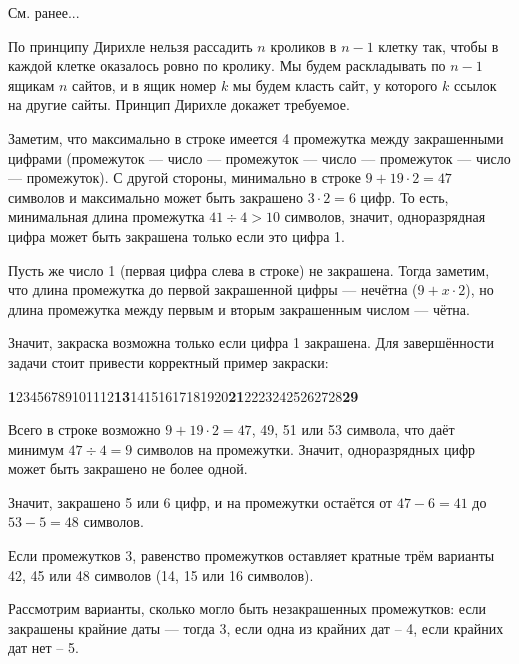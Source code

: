 
\begin{itemize}
\itA См. ранее...

\itB По принципу Дирихле нельзя рассадить $n$ кроликов в $n-1$ клетку так, 
чтобы в каждой клетке оказалось ровно по кролику.
Мы будем раскладывать по $n-1$ ящикам $n$ сайтов, и в ящик номер $k$ мы будем класть
сайт, у которого $k$ ссылок на другие сайты. Принцип Дирихле докажет требуемое.

\itC Заметим, что максимально в строке имеется 4 промежутка между закрашенными цифрами
(промежуток --- число --- промежуток --- число --- промежуток --- число --- промежуток).
С другой стороны, минимально в строке $9 + 19\cdot 2 = 47$ символов и максимально может 
быть закрашено $3 \cdot 2 = 6$ цифр.
То есть, минимальная длина промежутка $41 \div 4 > 10$ символов, значит, одноразрядная
цифра может быть закрашена только если это цифра 1.

Пусть же число 1 (первая цифра слева в строке) не закрашена. Тогда заметим, что длина
промежутка до первой закрашенной цифры --- нечётна ($9 + x \cdot 2$), но длина промежутка
между первым и вторым закрашенным числом --- чётна.

Значит, закраска возможна только если цифра 1 закрашена.
Для завершённости задачи стоит привести корректный пример закраски:

\begin{center}\ttfamily
{\bfseries 1}23456789101112{\bfseries 13}14151617181920{\bfseries 21}22232425262728{\bfseries 29}
\end{center}


Всего в строке возможно $9 + 19\cdot 2 = 47$, 49, 51 или 53 символа,
что даёт минимум $47 \div 4 = 9$ символов на промежутки. Значит,
одноразрядных цифр может быть закрашено не более одной.

Значит, закрашено 5 или 6 цифр, и на промежутки остаётся от $47-6=41$ до $53-5=48$ символов.

Если промежутков 3, равенство промежутков оставляет кратные трём варианты 42, 45 или 48
символов (14, 15 или 16 символов).


Рассмотрим варианты, сколько могло быть незакрашенных промежутков: 
если закрашены крайние даты --- тогда 3, если одна из крайних дат -- 4,
если крайних дат нет -- 5. 

\end{itemize}